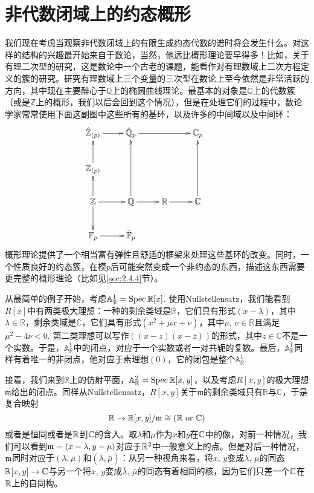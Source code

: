 \section{非代数闭域上的约态概形}

我们现在考虑当观察非代数闭域上的有限生成约态代数的谱时将会发生什么。对这样的结构的兴趣最开始来自于数论，当然，他远比概形理论要早得多！比如，关于有理二次型的研究，这是数论中一个古老的课题，能看作对有理数域上二次方程定义的簇的研究。研究有理数域上三个变量的三次型在数论上至今依然是非常活跃的方向，其中现在主要醉心于$\mathbb{Q}$上的椭圆曲线理论。最基本的对象是$\mathbb{Q}$上的代数簇（或是$\mathbb{Z}$上的概形，我们以后会回到这个情况），但是在处理它们的过程中，数论学家常常使用下面这副图中这些所有的基环，以及许多的中间域以及中间环：
\[
\begin{xy}
	\xymatrix{
		\hat{\mathbb{Z}}_{(p)}\ar[r]&\hat{\mathbb{Q}}_{p}\ar[rr]&&\mathbb{C}_p\\
		\mathbb{Z}_{(p)}\ar[u]&&&\\
		\mathbb{Z}\ar[u]\ar[r]\ar[d]&\mathbb{Q}\ar[r]\ar[uu]&\mathbb{R}\ar[r]&\mathbb{C}\ar[uu]\\
		\mathbb{F}_p\ar[r]&\bar{\mathbb{F}}_p&&&
	}
\end{xy}
\]
概形理论提供了一个相当富有弹性且舒适的框架来处理这些基环的改变。同时，一个性质良好的约态簇，在模$p$后可能突然变成一个非约态的东西，描述这东西需要更完整的概形理论（比如见\ref{sec:2.4.4}节）。

从最简单的例子开始，考虑$\mathbb{A}_{\mathbb{R}}^1=\operatorname{Spec} \mathbb{R}[x]$. 使用Nullstellensatz，我们能看到$R[x]$中有两类极大理想：一种的剩余类域是$\mathbb{R}$，它们具有形式$(x-\lambda)$，其中$\lambda\in\mathbb{R}$，剩余类域是$\mathbb{C}$，它们具有形式$(x^2+\mu x+\nu)$，其中$\mu$, $\nu\in\mathbb{R}$且满足$\mu^2-4\nu<0$. 第二类理想可以写作$((x-z)(x-\bar{z}))$的形式，其中$z\in \mathbb{C}$不是一个实数。于是，$\mathbb{A}_{\mathbb{R}}^1$中的闭点，对应于一个实数或者一对共轭的复数。最后，$\mathbb{A}_{\mathbb{R}}^1$同样有着唯一的非闭点，他对应于素理想$(0)$，它的闭包是整个$\mathbb{A}_{\mathbb{R}}^1$.

接着，我们来到$\mathbb{R}$上的仿射平面，$\mathbb{A}_{\mathbb{R}}^2=\operatorname{Spec} \mathbb{R}[x,y]$，以及考虑$R[x,y]$的极大理想$\mathfrak{m}$给出的闭点。同样从Nullstellensatz，$R[x,y]$关于$\mathfrak{m}$的剩余类域只有$\mathbb{R}$与$\mathbb{C}$，于是复合映射
\[
	\mathbb{R}\to \mathbb{R}[x,y]/\mathfrak{m}\cong (\mathbb{R} \text{ or } \mathbb{C})
\]
或者是恒同或者是$\mathbb{R}$到$\mathbb{C}$的含入。取$\lambda$和$\mu$作为$x$和$y$在$\mathbb{C}$中的像，对前一种情况，我们可以看到$\mathfrak{m}=(x-\lambda,y-\mu)$对应于$\mathbb{R}^2$中一般意义上的点。但是对后一种情况，$\mathfrak{m}$同时对应于$(\lambda,\mu)$和$(\bar\lambda,\bar\mu)$：从另一种视角来看，将$x$, $y$变成$\lambda$, $\mu$的同态$\mathbb{R}[x,y]\to \mathbb{C}$与另一个将$x$, $y$变成$\bar\lambda$, $\bar\mu$的同态有着相同的核，因为它们只差一个$\mathbb{C}$在$\mathbb{R}$上的自同构。

